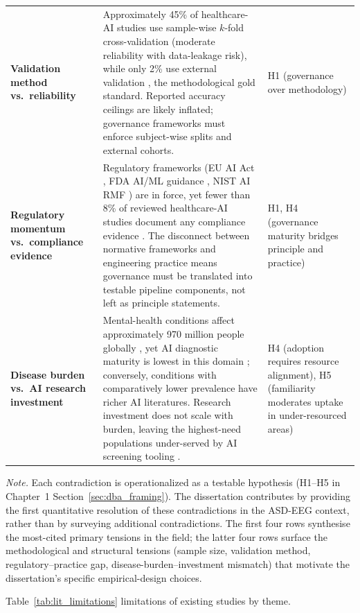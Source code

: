{\begin{xltabular}{\textwidth}{@{} >{\raggedright\arraybackslash}p{3.6cm} L >{\raggedright\arraybackslash}p{2.6cm} @{}}
\textbf{Validation method vs.\ reliability} & Approximately 45\% of healthcare-AI studies use sample-wise $k$-fold cross-validation (moderate reliability with data-leakage risk), while only 2\% use external validation \cite{rajkomar2019healthcare, esteva2019guide}, the methodological gold standard. Reported accuracy ceilings are likely inflated; governance frameworks must enforce subject-wise splits and external cohorts. & H1 (governance over methodology) \\
\textbf{Regulatory momentum vs.\ compliance evidence} & Regulatory frameworks (EU AI Act \cite{euaiact2024}, FDA AI/ML guidance \cite{fda2024aiml}, NIST AI RMF \cite{nist2023airmf}) are in force, yet fewer than 8\% of reviewed healthcare-AI studies document any compliance evidence \cite{kelly2019healthcare}. The disconnect between normative frameworks and engineering practice means governance must be translated into testable pipeline components, not left as principle statements. & H1, H4 (governance maturity bridges principle and practice) \\
\textbf{Disease burden vs.\ AI research investment} & Mental-health conditions affect approximately 970 million people globally \cite{who2022mental}, yet AI diagnostic maturity is lowest in this domain \cite{topol2019deep}; conversely, conditions with comparatively lower prevalence have richer AI literatures. Research investment does not scale with burden, leaving the highest-need populations under-served by AI screening tooling \cite{who2023asd}. & H4 (adoption requires resource alignment), H5 (familiarity moderates uptake in under-resourced areas) \\
\end{xltabular}}
\vspace{0.4em}
\noindent\textit{Note.} Each contradiction is operationalized as a testable hypothesis (H1--H5 in Chapter~1 Section~\ref{sec:dba_framing}). The dissertation contributes by providing the first quantitative resolution of these contradictions in the ASD-EEG context, rather than by surveying additional contradictions. The first four rows synthesise the most-cited primary tensions in the field; the latter four rows surface the methodological and structural tensions (sample size, validation method, regulatory--practice gap, disease-burden--investment mismatch) that motivate the dissertation's specific empirical-design choices.

\noindent Table~\ref{tab:lit_limitations} limitations of existing studies by theme.

